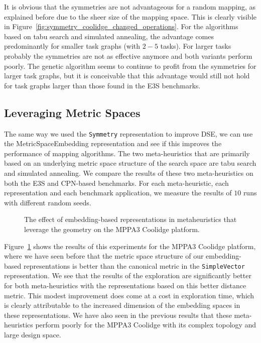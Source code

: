 It is obvious that the symmetries are not advantageous for a random mapping, as explained before due to the sheer size of the mapping space.
This is clearly visible in Figure~\ref{fig:symmetry_coolidge_changed_operations}.
For the algorithms based on tabu search and simulated annealing, the advantage comes predominantly for smaller task graphs (with $2-5$ tasks).
For larger tasks probably the symmetries are not as effective anymore and both variants perform poorly. 
The genetic algorithm seems to continue to profit from the symmetries for larger task graphs, but it is conceivable that this advantage would still not hold for task graphs larger than those found in the \ac{E3S} benchmarks.

\subsection{Leveraging Metric Spaces}

The same way we used the \texttt{Symmetry} representation to improve \ac{DSE}, we can use the \ac{MetricSpaceEmbedding} representation and see if this improves the performance of mapping algorithms.
The two meta-heuristics that are primarily based on an underlying metric space structure of the search space are tabu search and simulated annealing.
We compare the results of these two meta-heuristics on both the \ac{E3S} and \ac{CPN}-based benchmarks.
For each meta-heuristic, each representation and each benchmark application, we measure the results of $10$ runs with different random seeds.

\begin{figure}[h]
	\centering
   \resizebox{0.95\textwidth}{!}{}
	\caption{The effect of embedding-based representations in metaheuristics that leverage the geometry on the MPPA3 Coolidge platform.}
	\label{fig:coolidge_geometric}
\end{figure}

Figure~\ref{fig:coolidge_geometric} shows the results of this experiments for the MPPA3 Coolidge platform, where we have seen before that the metric space structure of our embedding-based representations is better than the canonical metric in the \texttt{SimpleVector} representation.
We see that the results of the exploration are significantly better for both meta-heuristics with the representations based on this better distance metric.
This modest improvement does come at a cost in exploration time, which is clearly attributable to the increased dimension of the embedding spaces in these representations.
We have also seen in the previous results that these meta-heuristics perform poorly for the MPPA3 Coolidge with its complex topology and large design space.

